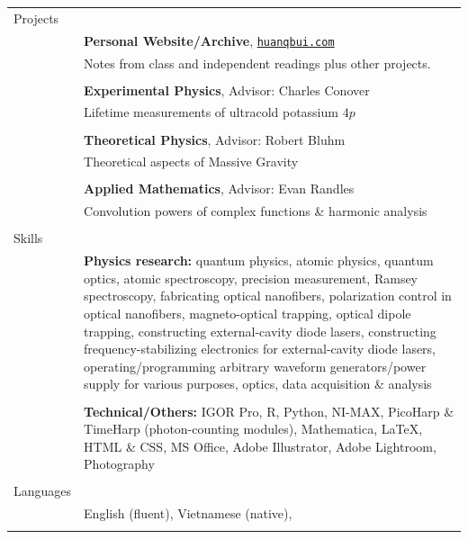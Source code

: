 \documentclass[10pt]{article}
\begin{document}
\begin{longtable}{ l m{13.5cm}   }
  \large{Projects}		& \\ 
  						& \textbf{Personal Website/Archive}, \href{https://huanqbui.com}{\texttt{huanqbui.com}} \\
  						& Notes from class and independent readings plus other projects.\\
  						& \\
  
  						& \textbf{Experimental Physics}, Advisor: Charles Conover \\
  						& Lifetime measurements of ultracold potassium $4p$\\
  						& \\
  						 
  						& \textbf{Theoretical Physics}, Advisor: Robert Bluhm\\
  						& Theoretical aspects of Massive Gravity\\
  						& \\
  						 
  						& \textbf{Applied Mathematics}, Advisor: Evan Randles\\
  						& Convolution powers of complex functions \& harmonic analysis\\
  						& \\
  						 
  						 
  \large{Skills}      	& \\ 
  						& \textbf{Physics research:} quantum physics, atomic physics, quantum optics, atomic spectroscopy, precision measurement, Ramsey spectroscopy, fabricating optical nanofibers, polarization control in optical nanofibers, magneto-optical trapping, optical dipole trapping, constructing external-cavity diode lasers, constructing frequency-stabilizing electronics for external-cavity diode lasers, operating/programming arbitrary waveform generators/power supply for various purposes, optics, data acquisition \& analysis \\
  						& \\
  						& \textbf{Technical/Others:} IGOR Pro, R, Python, NI-MAX, PicoHarp \& TimeHarp (photon-counting modules),  Mathematica, \LaTeX{}, HTML \& CSS, MS Office,  Adobe Illustrator, Adobe Lightroom, Photography \\ 
  						& \\
  						 
  				

  \large{Languages}     & \\
  						& English (fluent), Vietnamese (native), \\
						& \\
  						 

\end{longtable}
\end{document}
